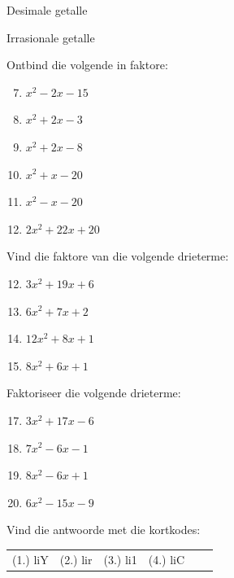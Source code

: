 \begin{Aktiwiteit}{Desimale getalle}
\begin{aktiwiteit}{Irrasionale getalle}
\begin{exercises}{}
{Ontbind die volgende in faktore:
\begin{multicols}{2}
\begin{enumerate}[itemsep=5pt, label=\textbf{\arabic*}. ] 
\setcounter{enumi}{6}
\item ${x}^{2}-2x-15$
\item ${x}^{2}+2x-3$
\item ${x}^{2}+2x-8$
\item ${x}^{2}+x-20$
\item ${x}^{2}-x-20$
\item $2{x}^{2}+22x+20$
\end{enumerate}
\end{multicols}


Vind die faktore van die volgende drieterme:
\begin{multicols}{2}
\begin{enumerate}[itemsep=5pt, label=\textbf{\arabic*}. ] 
\setcounter{enumi}{11}

\item $3{x}^{2}+19x+6$
\item $6{x}^{2}+7x+2$
\item $12{x}^{2}+8x+1$
\item $8{x}^{2}+6x+1$
\end{enumerate}
\end{multicols}

Faktoriseer die volgende drieterme:
\begin{multicols}{2}
\begin{enumerate}[itemsep=5pt, label=\textbf{\arabic*}. ] 
\setcounter{enumi}{16}
\item $3{x}^{2}+17x-6$
\item $7{x}^{2}-6x-1$
\item $8{x}^{2}-6x+1$
\item $6{x}^{2}-15x-9$
\end{enumerate}
\end{multicols}



    \label{m39394*cid6}
\par {} Vind die antwoorde met die kortkodes:
 \par \begin{tabular}[h]{cccccc}
 (1.) liY  &  (2.) lir  &  (3.) li1  &  (4.) liC  & \end{tabular}

}
\end{exercises}
\end{aktiwiteit}
\end{Aktiwiteit}
